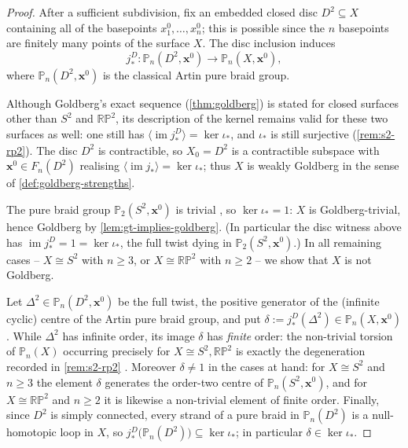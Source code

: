 \documentclass[reqno]{amsart}
\theoremstyle{definition}
\newcommand\bfx{\mathbf{x}}
\newcommand{\PB}{\mathbb{P}}
\newcommand{\im}{\operatorname{im}}
\newcommand{\RP}{\mathbb{RP}}
\newcommand{\co}[1]{\mathopen{\langle}#1\mathclose{\rangle}} %
\newcommand{\base}{\bfx^0}
\numberwithin{equation}{section}
\begin{document}
\begin{proof}
After a sufficient subdivision, fix an embedded closed disc
\(D^2\subseteq X\) containing all of the basepoints
\(x_1^0,\dots,x_n^0\); this is possible since the \(n\) basepoints
are finitely many points of the surface \(X\). The disc inclusion
induces
\[
j_\ast^{D}\colon \PB_n(D^2,\base)\longrightarrow\PB_n(X,\base),
\]
where \(\PB_n(D^2,\base)\) is the classical Artin pure braid group.

Although Goldberg's exact sequence (\cref{thm:goldberg}) is
stated for closed surfaces other than \(S^2\) and \(\RP^2\), its
description of the kernel remains valid for these two surfaces as
well: one still has \(\co{\im j_\ast^{D}}=\ker\iota_\ast\), and
\(\iota_\ast\) is still surjective (\cref{rem:s2-rp2}). The
disc \(D^2\) is contractible, so \(X_0=D^2\) is a contractible
subspace with \(\base\in F_n(D^2)\) realising
\(\co{\im j_\ast}=\ker\iota_\ast\); thus \(X\) is weakly Goldberg in the
sense of \cref{def:goldberg-strengths}.

The pure braid group \(\PB_2(S^2,\base)\) is trivial
\cite{VanBuskirk1966}, so \(\ker\iota_\ast=1\): \(X\) is
Goldberg-trivial, hence Goldberg by \cref{lem:gt-implies-goldberg}.
(In particular the disc witness above has
\(\im j_\ast^{D}=1=\ker\iota_\ast\), the full twist dying in
\(\PB_2(S^2,\base)\).) In all remaining cases -- \(X\cong S^2\)
with \(n\geq3\), or \(X\cong\RP^2\) with \(n\geq2\) -- we show
that \(X\) is not Goldberg.

Let \(\Delta^2\in\PB_n(D^2,\base)\) be the full twist, the
positive generator of the (infinite cyclic) centre of the Artin
pure braid group, and put
\(\delta:=j_\ast^{D}(\Delta^2)\in\PB_n(X,\base)\). While
\(\Delta^2\) has infinite order, its image \(\delta\) has
\emph{finite} order: the non-trivial torsion of \(\PB_n(X)\)
occurring precisely for \(X\cong S^2,\RP^2\) is exactly the
degeneration recorded in \cref{rem:s2-rp2}
\cite{VanBuskirk1966}. Moreover \(\delta\neq 1\) in the cases at hand: for
\(X\cong S^2\) and \(n\geq3\) the element \(\delta\) generates
the order-two centre of \(\PB_n(S^2,\base)\), and for
\(X\cong\RP^2\) and \(n\geq2\) it is likewise a non-trivial
element of finite order. Finally, since \(D^2\) is simply
connected, every strand of a pure braid in \(\PB_n(D^2)\) is a
null-homotopic loop in \(X\), so
\(j_\ast^{D}\bigl(\PB_n(D^2)\bigr)\subseteq\ker\iota_\ast\); in
particular \(\delta\in\ker\iota_\ast\).


\end{proof}
\end{document}
